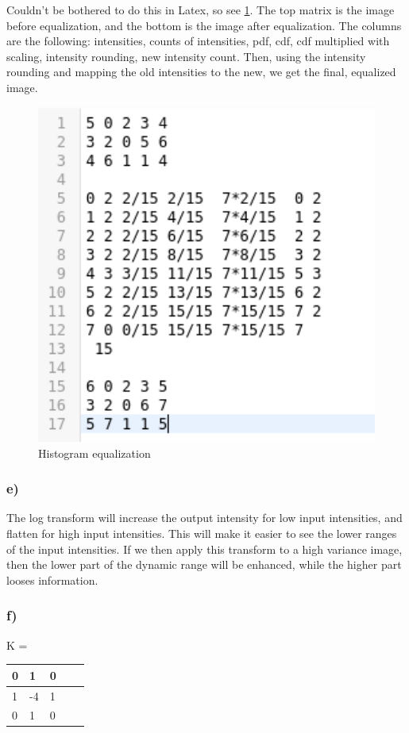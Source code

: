 Couldn't be bothered to do this in Latex, so see \cref{fig:equalizer}. The top matrix is the image before equalization, and the bottom is the image after equalization. The columns are the following: intensities, counts of intensities, pdf, cdf, cdf multiplied with scaling, intensity rounding, new intensity count. Then, using the intensity rounding and mapping the old intensities to the new, we get the final, equalized image. 
\begin{figure}[]
    \centering
    \includegraphics[width=1.00\textwidth]{figures/histogram_equalizer.png}
    \caption{Histogram equalization}
    \label{fig:equalizer}
\end{figure}

\subsubsection*{e)}
The log transform will increase the output intensity for low input intensities, and flatten for high input intensities. This will make it easier to see the lower ranges of the input intensities. If we then apply this transform to a high variance image, then the lower part of the dynamic range will be enhanced, while the higher part looses information. 
%
%
%

\subsubsection*{f)}
\begin{table}[]
    \label{tab:kernel}
    K = \begin{tabular}{|l|l|l|l|l|}
        \hline
        0 & 1 & 0 \\ \hline
        1 &-4 & 1 \\ \hline
        0 & 1 & 0 \\ \hline
    \end{tabular}
\end{table}

